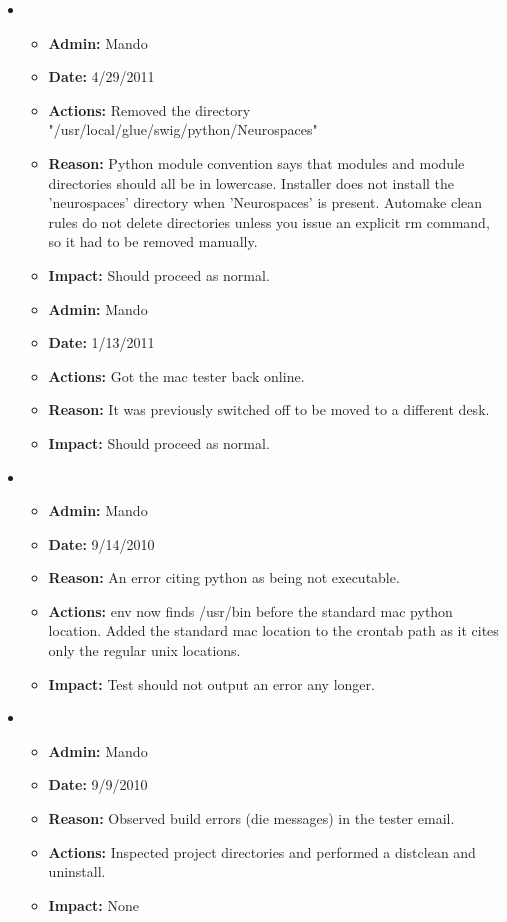 \documentclass[12pt]{article}
\begin{document}
\begin{itemize}
\item 

\begin{itemize}
\item[] {\bf Admin:} Mando
\item[] {\bf Date:} 4/29/2011
\item[] {\bf Actions:} Removed the directory "/usr/local/glue/swig/python/Neurospaces" 
\item[] {\bf Reason:}  Python module convention says that modules and module directories should all be in lowercase. Installer does not install the 'neurospaces' directory when
'Neurospaces' is present. Automake clean rules do not delete directories unless you issue an explicit rm command, so it had to be removed manually. 
\item[] {\bf Impact:}  Should proceed as normal.
\end{itemize}

\begin{itemize}
\item[] {\bf Admin:} Mando
\item[] {\bf Date:} 1/13/2011
\item[] {\bf Actions:} Got the mac tester back online.
\item[] {\bf Reason:}  It was previously switched off to be moved to a different desk.
\item[] {\bf Impact:}  Should proceed as normal.
\end{itemize}

\item 
\begin{itemize}
\item[] {\bf Admin:} Mando
\item[] {\bf Date:} 9/14/2010
\item[] {\bf Reason:} An error citing python as being not executable. 
\item[] {\bf Actions:} env now finds /usr/bin before the standard mac python location. Added the standard mac location to the crontab path as it cites only the regular unix locations.
\item[] {\bf Impact:} Test should not output an error any longer.
\end{itemize}
	
\item 
\begin{itemize}
\item[] {\bf Admin:} Mando
\item[] {\bf Date:} 9/9/2010
\item[] {\bf Reason:} Observed build errors (die messages) in the tester email. 
\item[] {\bf Actions:} Inspected project directories and performed a distclean and uninstall.
\item[] {\bf Impact:} None
\end{itemize}


\end{itemize}
\end{document}
